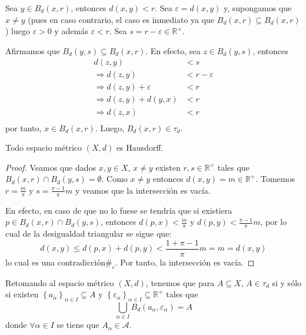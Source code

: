 \documentclass[12pt]{report}
\theoremstyle{largebreak}
\newcommand\contradiction{\ensuremath{\#_c}}
\begin{document}
    \begin{sol}
        Sea $y\in B_d(x,r)$, entonces $d(x,y)<r$. Sea $\varepsilon=d(x,y)$ y, supongamos que $x\neq y$ (pues en caso contrario, el caso es inmediato ya que $B_d(x,r)\subseteq B_d(x,r)$) luego $\varepsilon>0$ y además $\varepsilon<r$. Sea $s=r-\varepsilon\in\mathbb{R}^+$.

        Afirmamos que $B_d(y,s)\subseteq B_d(x,r)$. En efecto, sea $z\in B_d(y,s)$, entonces
        \begin{equation*}
            \begin{split}
                d(z,y)&<s\\
                \Rightarrow d(z,y)&<r-\varepsilon\\
                \Rightarrow d(z,y)+\varepsilon&<r\\
                \Rightarrow d(z,y)+d(y,x)&<r\\
                \Rightarrow d(z,x)&<r\\
            \end{split}
        \end{equation*}
        por tanto, $x\in B_d(x,r)$. Luego, $B_d(x,r)\in\tau_d$.
    \end{sol}

    \begin{lema}
        Todo espacio métrico $(X,d)$ es Hausdorff. 
    \end{lema}

    \begin{proof}
        Veamos que dados $x,y\in X$, $x\neq y$ existen $r,s\in\mathbb{R}^+$ tales que $B_d(x,r)\cap B_d(y,s)=\emptyset$. Como $x\neq y$ entonces $d(x,y)=m\in\mathbb{R}^+$. Tomemos $r=\frac{m}{\pi}$ y $s=\frac{\pi-1}{\pi}m$ y veamos que la intersección es vacía.
    
        En efecto, en caso de que no lo fuese se tendría que si existiera $p\in B_d(x,r)\cap B_d(y,s)$, entonces $d(p,x)<\frac{m}{\pi}$ y $d(p,y)<\frac{\pi-1}{\pi}m$, por lo cual de la desigualdad triangular se sigue que:
        \begin{equation*}
            d(x,y)\leq d(p,x)+d(p,y)<\frac{1+\pi-1}{\pi}m=m=d(x,y)
        \end{equation*}
        lo cual es una contradicción\contradiction. Por tanto, la intersección es vacía.
    \end{proof}

    Retomando al espacio métrico $(X,d)$, tenemos que para $A\subseteq X$, $A\in\tau_d$ si y sólo si existen $\left\{a_\alpha\right\}_{\alpha\in I}\subseteq A$ y $\left\{\varepsilon_\alpha\right\}_{\alpha\in I}\subseteq\mathbb{R}^+$ tales que
    \begin{equation*}
        \bigcup_{\alpha\in I }B_d(a_\alpha,\varepsilon_\alpha)=A
    \end{equation*}
    donde $\forall\alpha\in I$ se tiene que $A_\alpha\in \mathcal{A}$.
\end{document}
